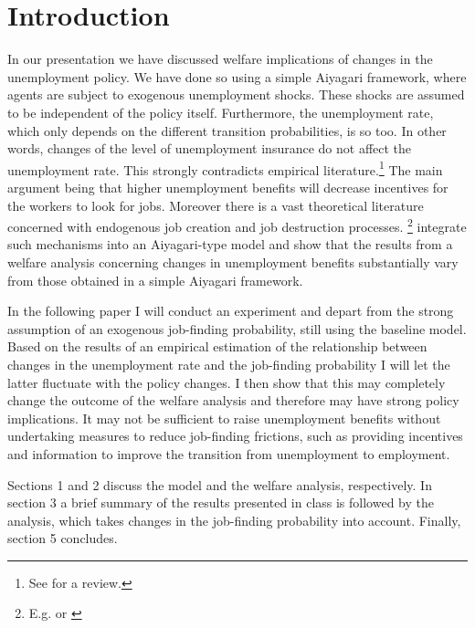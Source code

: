 \documentclass[a4paper,12pt]{article}
\begin{document}
\tableofcontents   %
% 
% 




\setcounter{page}{1}        %
\pagebreak


\section{Introduction}

In our presentation we have discussed welfare implications of changes in the unemployment policy. We have done so using a simple Aiyagari framework, where agents are subject to exogenous unemployment shocks. These shocks are assumed to be independent of the policy itself. Furthermore, the unemployment rate, which only depends on the different transition probabilities, is so too. In other words, changes of the level of unemployment insurance do not affect the unemployment rate. This strongly contradicts empirical literature.\footnote{See \citep{decker} for a review.} The main argument being that higher unemployment benefits will decrease incentives for the workers to look for jobs. Moreover there is a vast theoretical literature concerned with endogenous job creation and job destruction processes. \footnote{E.g. \cite{diamond1981mobility} or \cite{mortensen1994job}} \citep{KrusellMukoyamaSahin} integrate such mechanisms into an Aiyagari-type model and show that the results from a welfare analysis concerning changes in unemployment benefits substantially vary from those obtained in a simple Aiyagari framework. 

In the following paper I will conduct an experiment and depart from the strong assumption of an exogenous job-finding probability, still using the baseline model. Based on the results of an empirical estimation of the relationship between changes in the unemployment rate and the job-finding probability I will let the latter fluctuate with the policy changes. I then show that this may completely change the outcome of the welfare analysis and therefore may have strong policy implications. It may not be sufficient to raise unemployment benefits without undertaking measures to reduce job-finding frictions, such as providing incentives and information to improve the transition from unemployment to employment.

Sections 1 and 2 discuss the model and the welfare analysis, respectively. In section 3 a brief summary of the results presented in class is followed by the analysis, which takes changes in the job-finding probability into account. Finally, section 5 concludes. 
\end{document}

